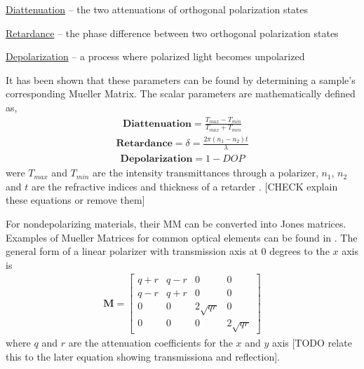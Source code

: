 
\underline{Diattenuation} – the two attenuations of orthogonal polarization states \cite{chipman}

\underline{Retardance} – the phase difference between two orthogonal polarization states \cite{giakos}

\underline{Depolarization} – a process where polarized light becomes unpolarized \cite{giakos}

It has been shown that these parameters can be found by determining a sample's corresponding Mueller Matrix. The scalar parameters are mathematically defined as,
\begin{align}
    \mathbf{Diattenuation} = \frac{T_{max} - T_{min}}{T_{max} + T_{min}}
\end{align}
\begin{align}
    \mathbf{Retardance} = \delta = \frac{2\pi(n_1 - n_2)t}{\lambda}
\end{align}
\begin{align}
    \mathbf{Depolarization} = 1 - DOP
\end{align}
were $T_{max}$ and $T_{min}$ are the intensity transmittances through a polarizer, $n_1$, $n_2$ and $t$ are the refractive indices and thickness of a retarder \cite{chipman}.
[CHECK explain these equations or remove them]

For nondepolarizing materials, their MM can be converted into Jones matrices.   Examples of Mueller Matrices for common optical elements can be found in \cite{chipman}.  The general form of a linear polarizer with transmission axis at 0 degrees to the $x$ axis is
%
\begin{align}
    \mathbf{M} =
    \begin{bmatrix}
        q + r & q - r & 0 & 0 \\
        q-r & q+r & 0  & 0 \\
        0 & 0 & 2\sqrt{qr} & 0 \\
        0 & 0 & 0 & 2\sqrt{qr}
    \end{bmatrix}
\end{align}
%
where $q$ and $r$ are the attenuation coefficients for the $x$ and $y$ axis [TODO relate this to the later equation showing transmissiona and reflection].

